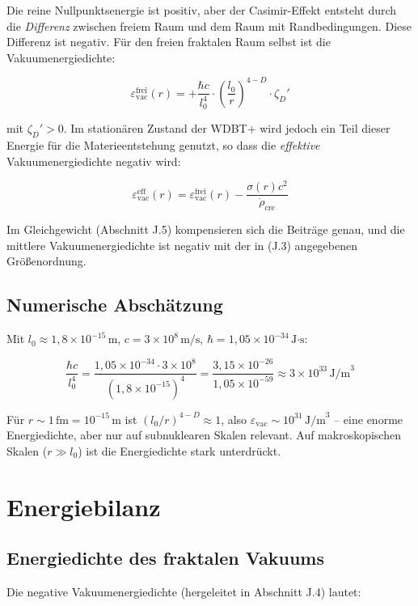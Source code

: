 Die reine Nullpunktsenergie ist positiv, aber der Casimir-Effekt entsteht durch die 
\emph{Differenz} zwischen freiem Raum und dem Raum mit Randbedingungen. 
Diese Differenz ist negativ. Für den freien fraktalen Raum selbst ist die 
Vakuumenergiedichte:

\[
\varepsilon_{\text{vac}}^{\text{frei}}(r) = +\frac{\hbar c}{l_0^4} \cdot 
\left( \frac{l_0}{r} \right)^{4-D} \cdot \zeta_D' \tag{J.6}
\]

mit \( \zeta_D' > 0 \). Im stationären Zustand der WDBT+ wird jedoch ein Teil dieser Energie 
für die Materieentstehung genutzt, so dass die \emph{effektive} Vakuumenergiedichte 
negativ wird:

\[
\varepsilon_{\text{vac}}^{\text{eff}}(r) = \varepsilon_{\text{vac}}^{\text{frei}}(r) - 
\frac{\sigma(r) c^2}{\dot{\rho}_{\text{cre}}} \tag{J.7}
\]

Im Gleichgewicht (Abschnitt J.5) kompensieren sich die Beiträge genau, und die mittlere 
Vakuumenergiedichte ist negativ mit der in (J.3) angegebenen Größenordnung.

\subsection{Numerische Abschätzung}

Mit \( l_0 \approx 1,8 \times 10^{-15} \, \text{m} \), \( c = 3 \times 10^8 \, \text{m/s} \), 
\( \hbar = 1,05 \times 10^{-34} \, \text{J·s} \):

\[
\frac{\hbar c}{l_0^4} = \frac{1,05 \times 10^{-34} \cdot 3 \times 10^8}{(1,8 \times 10^{-15})^4}
= \frac{3,15 \times 10^{-26}}{1,05 \times 10^{-59}} \approx 3 \times 10^{33} \, \text{J/m}^3
\]

Für \( r \sim 1 \, \text{fm} = 10^{-15} \, \text{m} \) ist \( (l_0/r)^{4-D} \approx 1 \), 
also \( \varepsilon_{\text{vac}} \sim 10^{31} \, \text{J/m}^3 \) – eine enorme 
Energiedichte, aber nur auf subnuklearen Skalen relevant. Auf makroskopischen Skalen 
(\( r \gg l_0 \)) ist die Energiedichte stark unterdrückt.

\section{Energiebilanz}

\subsection{Energiedichte des fraktalen Vakuums}

Die negative Vakuumenergiedichte (hergeleitet in Abschnitt J.4) lautet:

